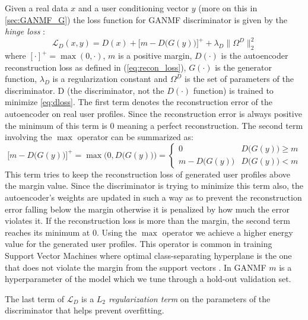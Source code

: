 Given a real data $x$ and a user conditioning vector $y$ (more on this in \ref{sec:GANMF_G}) the loss function for GANMF discriminator is given by the \emph{hinge loss} \cite{zhao2016energy}:
\begin{equation}
    \mathcal{L}_{D}(x, y) = D(x) + \big[m - D\big(G(y)\big)\big]^{+} + \lambda_{D} \|\Omega^{D}\|^{2}_{2}
    \label{eq:dloss}
\end{equation}
where $[\cdot]^+ = \max (0, \cdot)$, $m$ is a positive margin, $D(\cdot)$ is the autoencoder reconstruction loss as defined in (\ref{eq:recon_loss}), $G(\cdot)$ is the generator function, $\lambda_{D}$ is a regularization constant and $\Omega^{D}$ is the set of parameters of the discriminator.
D (the discriminator, not the $D(\cdot)$ function) is trained to minimize \ref{eq:dloss}. The first term denotes the reconstruction error of the autoencoder on real user profiles. Since the reconstruction error is always positive the minimum of this term is 0 meaning a perfect reconstruction. The second term involving the $\max$ operator can be summarized as:
\[
    \big[m - D\big(G(y)\big)\big]^+ = \max \Big(0, D\big(G(y)\big)\Big) = 
    \begin{cases}
        0 & D\big(G(y)\big) \geq m \\
        m - D\big(G(y)\big) & D\big(G(y)\big) < m
    \end{cases}
\]
This term tries to keep the reconstruction loss of generated user profiles above the margin value. Since the discriminator is trying to minimize this term also, the autoencoder's weights are updated in such a way as to prevent the reconstruction error falling below the margin otherwise it is penalized by how much the error violates it. If the reconstruction loss is more than the margin, the second term reaches its minimum at 0. Using the $\max$ operator we achieve a higher energy value for the generated user profiles. This operator is common in training Support Vector Machines where optimal class-separating hyperplane is the one that does not violate the margin from the support vectors \cite{cortes1995support}. In GANMF $m$ is a hyperparameter of the model which we tune through a hold-out validation set.

The last term of $\mathcal{L}_{D}$ is a \emph{$L_{2}$ regularization term} on the parameters of the discriminator that helps prevent overfitting.

